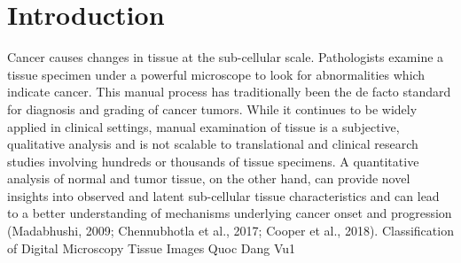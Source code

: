 
\chapter{Introduction}\label{chapter:introduction}
Cancer causes changes in tissue at the sub-cellular scale. Pathologists examine a tissue specimen
under a powerful microscope to look for abnormalities which indicate cancer. This manual
process has traditionally been the de facto standard for diagnosis and grading of cancer tumors.
While it continues to be widely applied in clinical settings, manual examination of tissue is a
subjective, qualitative analysis and is not scalable to translational and clinical research studies
involving hundreds or thousands of tissue specimens. A quantitative analysis of normal and tumor
tissue, on the other hand, can provide novel insights into observed and latent sub-cellular tissue characteristics and can lead to a better understanding of
mechanisms underlying cancer onset and progression
(Madabhushi, 2009; Chennubhotla et al., 2017;
Cooper et al., 2018). 
Classification of Digital Microscopy
Tissue Images
Quoc Dang Vu1
